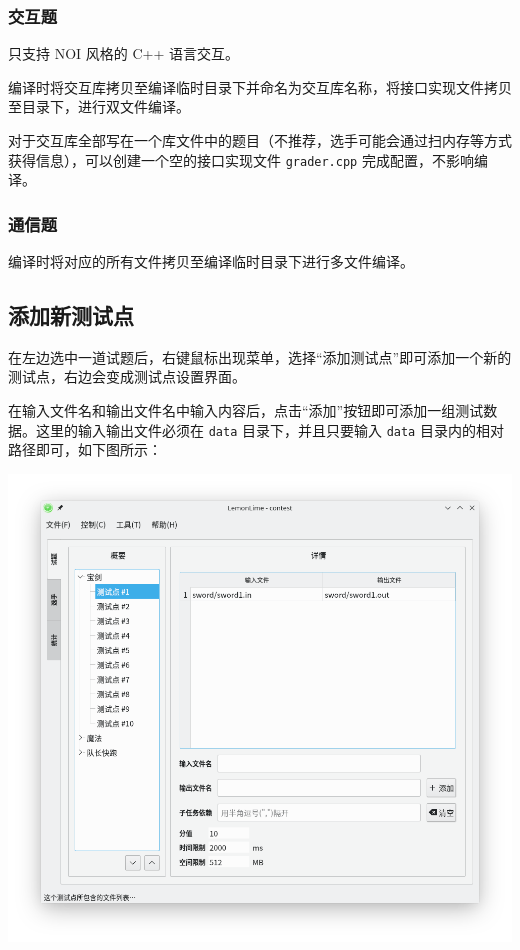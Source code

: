 \documentclass[UTF-8]{ctexart}
\begin{document}
			\subsubsection{交互题}
				
				只支持 NOI 风格的 C++ 语言交互。
				
				编译时将交互库拷贝至编译临时目录下并命名为交互库名称，将接口实现文件拷贝至目录下，进行双文件编译。
				
				对于交互库全部写在一个库文件中的题目（不推荐，选手可能会通过扫内存等方式获得信息），可以创建一个空的接口实现文件 \texttt{grader.cpp} 完成配置，不影响编译。
				
			\subsubsection{通信题}
			
				编译时将对应的所有文件拷贝至编译临时目录下进行多文件编译。
		
		\subsection{添加新测试点}
		
			在左边选中一道试题后，右键鼠标出现菜单，选择“添加测试点”即可添加一个新的测试点，右边会变成测试点设置界面。
			
			在输入文件名和输出文件名中输入内容后，点击“添加”按钮即可添加一组测试数据。这里的输入输出文件必须在 \texttt{data} 目录下，并且只要输入 \texttt{data} 目录内的相对路径即可，如下图所示：
			
			\begin{center}
			\includegraphics[scale=0.5]{pics/edittestcase.png}
			\end{center}
			
\end{document}
